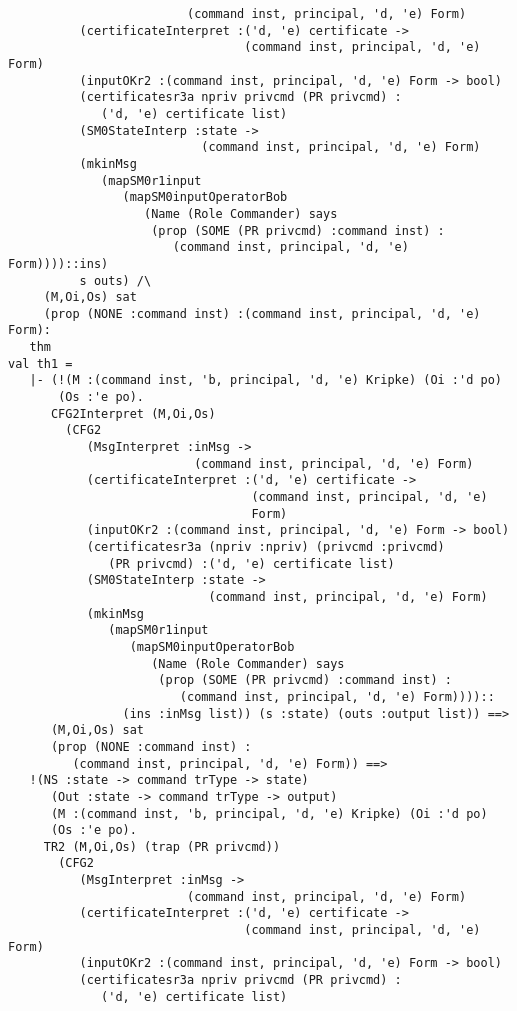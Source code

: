 \documentclass{report}
\begin{document}
\begin{session}
\begin{scriptsize}
\begin{verbatim}
                         (command inst, principal, 'd, 'e) Form)
          (certificateInterpret :('d, 'e) certificate ->
                                 (command inst, principal, 'd, 'e) Form)
          (inputOKr2 :(command inst, principal, 'd, 'e) Form -> bool)
          (certificatesr3a npriv privcmd (PR privcmd) :
             ('d, 'e) certificate list)
          (SM0StateInterp :state ->
                           (command inst, principal, 'd, 'e) Form)
          (mkinMsg
             (mapSM0r1input
                (mapSM0inputOperatorBob
                   (Name (Role Commander) says
                    (prop (SOME (PR privcmd) :command inst) :
                       (command inst, principal, 'd, 'e) Form))))::ins)
          s outs) /\
     (M,Oi,Os) sat
     (prop (NONE :command inst) :(command inst, principal, 'd, 'e) Form):
   thm
val th1 =
   |- (!(M :(command inst, 'b, principal, 'd, 'e) Kripke) (Oi :'d po)
       (Os :'e po).
      CFG2Interpret (M,Oi,Os)
        (CFG2
           (MsgInterpret :inMsg ->
                          (command inst, principal, 'd, 'e) Form)
           (certificateInterpret :('d, 'e) certificate ->
                                  (command inst, principal, 'd, 'e)
                                  Form)
           (inputOKr2 :(command inst, principal, 'd, 'e) Form -> bool)
           (certificatesr3a (npriv :npriv) (privcmd :privcmd)
              (PR privcmd) :('d, 'e) certificate list)
           (SM0StateInterp :state ->
                            (command inst, principal, 'd, 'e) Form)
           (mkinMsg
              (mapSM0r1input
                 (mapSM0inputOperatorBob
                    (Name (Role Commander) says
                     (prop (SOME (PR privcmd) :command inst) :
                        (command inst, principal, 'd, 'e) Form))))::
                (ins :inMsg list)) (s :state) (outs :output list)) ==>
      (M,Oi,Os) sat
      (prop (NONE :command inst) :
         (command inst, principal, 'd, 'e) Form)) ==>
   !(NS :state -> command trType -> state)
      (Out :state -> command trType -> output)
      (M :(command inst, 'b, principal, 'd, 'e) Kripke) (Oi :'d po)
      (Os :'e po).
     TR2 (M,Oi,Os) (trap (PR privcmd))
       (CFG2
          (MsgInterpret :inMsg ->
                         (command inst, principal, 'd, 'e) Form)
          (certificateInterpret :('d, 'e) certificate ->
                                 (command inst, principal, 'd, 'e) Form)
          (inputOKr2 :(command inst, principal, 'd, 'e) Form -> bool)
          (certificatesr3a npriv privcmd (PR privcmd) :
             ('d, 'e) certificate list)

\end{verbatim}
\end{scriptsize}
\end{session}
\end{document}

